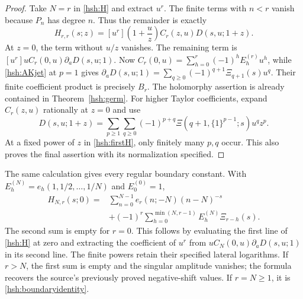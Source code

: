 \begin{proof}
Take $N=r$ in \eqref{hsh:H} and extract $u^r$.  The finite terms
with $n<r$ vanish because $P_n$ has degree $n$.  Thus the remainder
is exactly
\begin{equation}\label{hsh:firstH}
 H_{r,r}(s;z)=[u^r]\left(1+\frac uz\right)
                          C_r(z,u)D(s,u;1+z).
\end{equation}
At $z=0$, the term without $u/z$ vanishes.  The remaining term is
$[u^r]uC_r(0,u)\partial_aD(s,u;1)$.
Now $C_r(0,u)=\sum_{h=0}^r(-1)^hE_h^{(r)}u^h$, while
\eqref{hsh:AKjet} at $p=1$ gives
$\partial_aD(s,u;1)=\sum_{q\geq0}(-1)^{q+1}\Xi_{q+1}(s)u^q$.
Their finite coefficient product is precisely $B_r$.
The holomorphy assertion is already contained in
Theorem~\ref{hsh:germ}.  For higher Taylor coefficients, expand
$C_r(z,u)$ rationally at $z=0$ and use
\[
 D(s,u;1+z)=\sum_{p\geq1}\sum_{q\geq0}
       (-1)^{p+q}\Xi(q+1,\{1\}^{p-1};s)u^qz^p.
\]
At a fixed power of $z$ in \eqref{hsh:firstH}, only finitely many
$p,q$ occur.  This also proves the final assertion with its
normalization specified.
\end{proof}

The same calculation gives every regular boundary constant.  With
$E_h^{(N)}=e_h(1,1/2,\ldots,1/N)$ and $E_0^{(0)}=1$,
\begin{equation}\label{hsh:allregular}
 \begin{split}
 H_{N,r}(s;0)={}&\sum_{n=0}^{N-1}e_r(n;-N)(n-N)^{-s}\\
 &+(-1)^r\sum_{h=0}^{\min(N,r-1)}E_h^{(N)}\Xi_{r-h}(s).
 \end{split}
\end{equation}
The second sum is empty for $r=0$.  This follows by evaluating the
first line of \eqref{hsh:H} at zero and extracting the coefficient
of $u^r$ from $uC_N(0,u)\partial_aD(s,u;1)$ in its second line.
The finite powers retain their specified lateral logarithms.  If
$r>N$, the first sum is empty and the singular amplitude vanishes;
the formula recovers the source's previously proved negative-shift
values.  If $r=N\geq1$, it is \eqref{hsh:boundaryidentity}.

